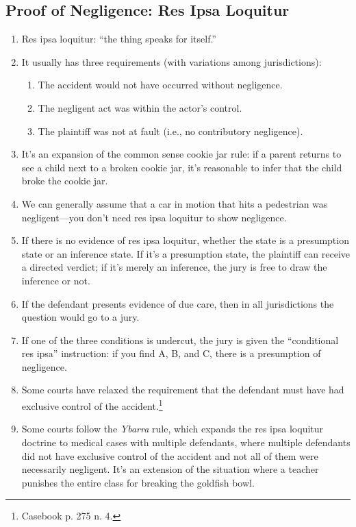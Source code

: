 \subsection{Proof of Negligence: Res Ipsa Loquitur}

\begin{enumerate}
    \item Res ipsa loquitur: ``the thing speaks for itself.''
    \item It usually has three requirements (with variations among 
    jurisdictions):
    \begin{enumerate}
        \item The accident would not have occurred without negligence.
        \item The negligent act was within the actor's control.
        \item The plaintiff was not at fault (i.e., no contributory 
        negligence).
    \end{enumerate}
    \item It's an expansion of the common sense cookie jar rule: if a parent 
    returns to see a child next to a broken cookie jar, it's reasonable to 
    infer that the child broke the cookie jar.
    \item We can generally assume that a car in motion that hits a pedestrian 
    was negligent---you don't need res ipsa loquitur to show negligence.
    \item If there is no evidence of res ipsa loquitur, whether the state is a 
    presumption state or an inference state. If it's a presumption state, the 
    plaintiff can receive a directed verdict; if it's merely an inference, the 
    jury is free to draw the inference or not.
    \item If the defendant presents evidence of due care, then in all 
    jurisdictions the question would go to a jury.
    \item If one of the three conditions is undercut, the jury is given the 
    ``conditional res ipsa'' instruction: if you find A, B, and C, there is a 
    presumption of negligence.
    \item Some courts have relaxed the requirement that the defendant must 
    have had exclusive control of the accident.\footnote{Casebook p. 275 n. 
    4.}
    \item Some courts follow the \emph{Ybarra} rule, which expands the res 
    ipsa loquitur doctrine to medical cases with multiple defendants, where 
    multiple defendants did not have exclusive control of the accident and not 
    all of them were necessarily negligent. It's an extension of the situation 
    where a teacher punishes the entire class for breaking the goldfish bowl.
\end{enumerate}

